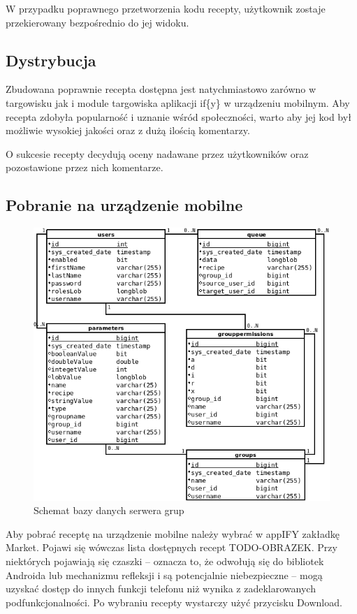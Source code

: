 \documentclass[11pt,a4paper,polish,thesis]{dcsbook}
\begin{document}
W przypadku poprawnego przetworzenia kodu recepty, użytkownik zostaje przekierowany bezpośrednio do jej widoku.
\subsection{Dystrybucja}
Zbudowana poprawnie recepta dostępna jest natychmiastowo zarówno w targowisku jak i module targowiska aplikacji if\{y\} w urządzeniu mobilnym. Aby recepta
zdobyła popularność i uznanie wśród społeczności, warto aby jej kod był możliwie wysokiej jakości oraz z dużą ilością komentarzy.

O sukcesie recepty decydują oceny nadawane przez użytkowników oraz pozostawione przez nich komentarze.
\subsection{Pobranie na urządzenie mobilne}
\begin{figure}[h]
  \centering
  \includegraphics[scale=0.7]{./resources/server_db.png}
  \caption{Schemat bazy danych serwera grup}
  \label{fig:server_db}
\end{figure}
Aby pobrać receptę na urządzenie mobilne należy wybrać w appIFY zakładkę Market. Pojawi się wówczas lista dostępnych recept TODO-OBRAZEK. Przy niektórych pojawiają się czaszki -- oznacza to, że odwołują się do bibliotek Androida lub mechanizmu refleksji i są potencjalnie niebezpieczne -- mogą uzyskać dostęp do innych funkcji telefonu niż wynika z zadeklarowanych podfunkcjonalności. 
Po wybraniu recepty wystarczy użyć przycisku Download.
\end{document}
